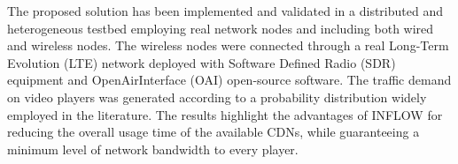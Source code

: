 The proposed solution has been implemented and validated in a distributed and heterogeneous testbed employing real network nodes and including both wired and wireless nodes. The wireless nodes were connected through a real Long-Term Evolution (LTE) network deployed with Software Defined Radio (SDR) equipment and OpenAirInterface (OAI) open-source software. The traffic demand on video players was generated according to a probability distribution widely employed in the literature. The results highlight the advantages of INFLOW for reducing the overall usage time of the available CDNs, while guaranteeing a minimum level of network bandwidth to every player.